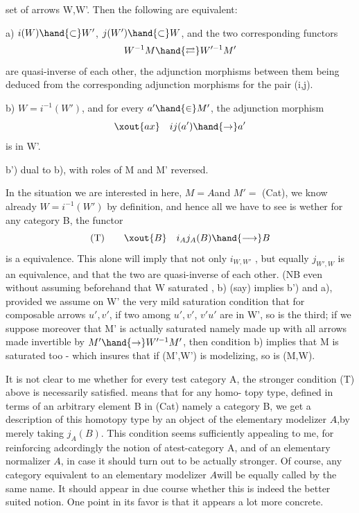 set of arrows W,W'. Then the following are equivalent:

a) $i(W)\hand{\subset} W'$, $j(W')\hand{\subset} W$, and the two corresponding functors
\[ W^{-1}M \hand{\rightleftarrows} W'^{-1}M' \]
are quasi-inverse of each other, the adjunction morphisms between
them being deduced from the corresponding adjunction morphisms
for the pair (i,j).

b) $W=i^{-1}(W')$, and for every $a'\hand{\in} M'$, the adjunction morphism
\[ \xout{ax} \quad ij(a')\hand{\to} a' \]
is in W'.

b') dual to b), with roles of M and M' reversed.

In the situation we are interested in here, $M = A\hat{}$\hand{/}and $M' = $ (Cat),
we know already $W=i^{-1}(W')$ by definition, and hence all we have to see is
wether for any \inserted{[small]} category B, the functor
\[ \text{(T)} \qquad \xout{B} \quad i_A j_A(B) \hand{\longrightarrow} B \]
is a equivalence. This alone will imply that not only $i_{W,W'}$ , but
equally $j_{W',W}$ is an equivalence, and that the two are quasi-inverse of
each other. (NB even without assuming beforehand that W  saturated ,
b) (say) implies b') and a),  provided we assume on W' the very mild
saturation condition that for composable arrows $u',v'$, if two among $u',v'$,
$v'u'$ are in W', so is the third;  if we suppose moreover that
M' is actually saturated namely made up with all arrows made invertible by
$M'\hand{\to} W'^{-1}M'$, then condition b) implies that M is saturated too - which
insures that if (M',W') is modelizing, so is (M,W).\hand{)}

It is not clear to me whether for every test category A, the stronger
condition (T) above is necessarily satisfied.   means that for any homo-%
topy type, defined in terms of an arbitrary element B in (Cat) namely
a category B, we get a description of this homotopy type by an object of
the elementary modelizer $A\hat{}$,\hand{|}by merely taking $j_A(B)$. This condition seems
sufficiently appealing to me, for reinforcing adcordingly the notion of
atest-category A, and of an elementary normalizer $A\hat{}$, in case it should
turn out to be actually stronger. Of course, any category equivalent to
an elementary modelizer $A\hat{}$\hand{/}will be equally called by the same name. It 
should appear in  due course whether this is indeed the better suited
notion. One point in its favor  is that it appears a lot more
concrete.

